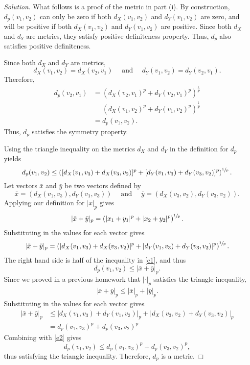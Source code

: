 \documentclass[11pt,letterpaper]{article}
\newenvironment{solution}
  {\renewcommand\qedsymbol{}\begin{proof}[Solution]}
  {\end{proof}\bigskip}
\begin{document}
\begin{solution}
	What follows is a proof of the metric in part (i). By construction, $d_p(v_1,v_2)$ can only be zero if both $d_X(v_1,v_2)$ and $d_Y(v_1,v_2)$ are zero, and will be positive if both $d_X(v_1,v_2)$ and $d_Y(v_1,v_2)$ are positive. Since both $d_X$ and $d_Y$ are metrics, they satisfy positive definiteness property. Thus, $d_p$ also satisfies positive definiteness.
	
	Since both $d_X$ and $d_Y$ are metrics, $$d_X(v_1,v_2) = d_X(v_2,v_1) \quad \text{ and } \quad d_Y(v_1,v_2) = d_Y(v_2,v_1).$$ Therefore, 
	\[\begin{split}
		d_p(v_2,v_1) &= \left( d_X(v_2,v_1)^p + d_Y(v_2,v_1)^p\right)^\frac{1}{p}\\
		&= \left( d_X(v_1,v_2)^p + d_Y(v_1,v_2)^p\right)^\frac{1}{p}\\
		&= d_p(v_1,v_2).
	\end{split}\]
	Thus, $d_p$ satisfies the symmetry property.
	
	
	Using the triangle inequality on the metrics $d_X$ and $d_Y$ in the definition for $d_p$ yields 
	\begin{equation}\label{e1}
	d_p(v_1,v_2) \leq \left ( [d_X(v_1,v_3) + d_X(v_3,v_2)]^p + [d_Y(v_1,v_3) + d_Y(v_3,v_2)]^p \right )^{\sfrac{1}{p}}.
	\end{equation}
	Let vectors $\bar x$ and $\bar y$ be two vectors defined by $$\bar x = (d_X(v_1,v_3), d_Y(v_1,v_3)) \quad \text{ and } \quad \bar y = (d_X(v_3,v_2), d_Y(v_3,v_2)).$$ Applying our definition for $|x|_p$ gives
	\[\begin{split}
		|\bar x +\bar y|_p = \left(|x_1 + y_1|^p + |x_2+y_2|^p\right)^{\sfrac{1}{p}}.
	\end{split}\]
	Substituting in the values for each vector gives
	\[\begin{split}
		|\bar x +\bar y|_p = \left(|d_X(v_1,v_3) + d_X(v_3,v_2)|^p + |d_Y(v_1,v_3)+d_Y(v_3,v_2)|^p\right)^{\sfrac{1}{p}}.
	\end{split}\]
	The right hand side is half of the inequality in \eqref{e1}, and thus 
	\begin{equation}\label{e2}
	d_p(v_1, v_2) \leq |\bar x +\bar y|_p.
	\end{equation}
	Since we proved in a previous homework that $|\cdot|_p$ satisfies the triangle inequality,
	\[\begin{split}
		|\bar x +\bar y|_p \leq |\bar x|_p + |\bar y|_p.
	\end{split}\]
	Substituting in the values for each vector gives 
	\[\begin{split}
		|\bar x +\bar y|_p &\leq |d_X(v_1,v_3) + d_Y(v_1,v_3)|_p + |d_X(v_3,v_2)+ d_Y(v_3,v_2)|_p\\
		& = d_p(v_1,v_3)^p + d_p(v_3,v_2)^p
	\end{split}\]
	Combining with \eqref{e2} gives $$d_p(v_1, v_2) \leq d_p(v_1,v_3)^p + d_p(v_3,v_2)^p,$$ thus satisfying the triangle inequality. Therefore, $d_p$ is a metric.
	

\end{solution}
\end{document}
